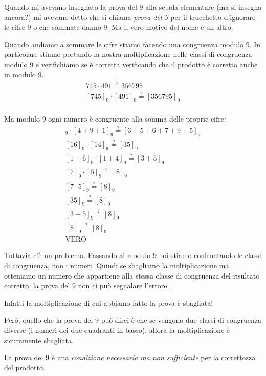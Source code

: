 Quando mi avevano insegnato la prova del 9 alla scuola elementare (ma si insegna ancora?) mi avevano detto che si chiama
\emph{prova del 9} per il trucchetto d'ignorare le cifre 9 o che sommate danno 9.
Ma il vero motivo del nome è un altro.

Quando andiamo a sommare le cifre stiamo facendo una congruenza modulo 9.
In particolare stiamo portando la nostra moltiplicazione nelle classi di congruenza modulo 9 e verifichiamo se è
corretta verificando che il prodotto è corretto anche in modulo 9.
\begin{gather*}
	745 \cdot 491 \overset{?}{=} 356795 \\
	[745]_9 \cdot [491]_9 \overset{?}{=} [356795]_9 \\
\end{gather*}

Ma modulo 9 ogni numero è congruente alla somma delle proprie cifre:
\begin{gather*}
	[7+4+5]_9 \cdot [4+9+1]_9 \overset{?}{=} [3+5+6+7+9+5]_9 \\
	[16]_9 \cdot [14]_9 \overset{?}{=} [35]_9 \\
	[1+6]_9 \cdot [1+4]_9 \overset{?}{=} [3+5]_9 \\
	[7]_9 \cdot [5]_9 \overset{?}{=} [8]_9 \\
	[7 \cdot 5]_9 \overset{?}{=} [8]_9 \\
	[35]_9 \overset{?}{=} [8]_9 \\
	[3 + 5]_9 \overset{?}{=} [8]_9 \\
	[8]_9 \overset{?}{=} [8]_9 \\
	\text{VERO}
\end{gather*}

Tuttavia c'è un problema.
Passando al modulo 9 noi stiamo confrontando le classi di congruenza, non i numeri.
Quindi se sbagliamo la moltiplicazione ma otteniamo un numero che appartiene alla stessa classe di congruenza del
risultato corretto, la prova del 9 non ci può segnalare l'errore.

Infatti la moltiplicazione di cui abbiamo fatto la prova è sbagliata!

Però, quello che la prova del 9 può dirci è che se vengono due classi di congruenza diverse (i numeri dei due quadranti
in basso), allora la moltiplicazione è sicuramente sbagliata.

La prova del 9 è una \emph{condizione necessaria ma non sufficiente} per la correttezza del prodotto.

